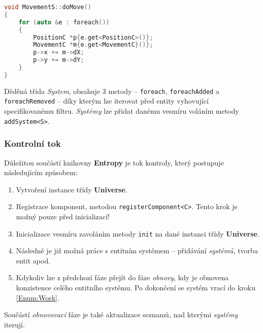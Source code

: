 \begin{lstlisting}[backgroundcolor = \color{lightgray}, language = C++, xleftmargin = 2cm, framexleftmargin = 1em, tabsize=4]
void MovementS::doMove()
{
	for (auto &e : foreach())
	{
		PositionC *p{e.get<PositionC>()};
		MovementC *m{e.get<MovementC}()};
		p->x += m->dX;
		p->y += m->dY;
	}
}
\end{lstlisting}

\noindent Děděná třída \emph{System}, obsahuje 3 metody -- \texttt{foreach}, \texttt{foreachAdded} a \texttt{foreachRemoved} -- díky kterým lze iterovat před entity vyhovující specifikovanému filtru. \emph{Systémy} lze přidat danému vesmíru voláním metody \texttt{addSystem<S>}.

\subsubsection*{Kontrolní tok}

Důležitou součástí knihovny \textbf{Entropy} je tok kontroly, který postupuje následujícím způsobem: 
\begin{enumerate}
	\item Vytvoření instance třídy \textbf{Universe}.
	\item Registrace komponent, metodou \texttt{registerComponent<C>}. Tento krok je možný pouze před inicializací!
	\item Inicializace vesmíru zavoláním metody \texttt{init} na dané instanci třídy \textbf{Universe}.
	\item Následně je již možná práce s entitním systémem -- přidávání \emph{systémů}, tvorba entit apod. \label{Enum:Work}
	\item Kdykoliv lze z předchozí fáze přejít do fáze \emph{obnovy}, kdy je obnovena konzistence celého entitního systému. Po dokončení se systém vrací do kroku \ref{Enum:Work}.
\end{enumerate}

\noindent Součástí \emph{obnovovací} fáze je také aktualizace seznamů, nad kterými \emph{systémy} iterují. 



